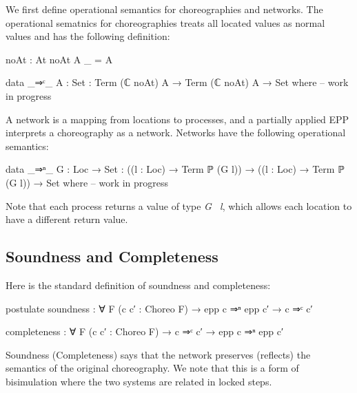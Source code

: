We first define operational semantics for choreographies and networks.
%
The operational sematnics for choreographies treats all located values as normal values and has the following definition:
%
\begin{center}\begin{code}
noAt : At
noAt A _ = A

data _⇒ᶜ_ {A : Set} : Term (ℂ noAt) A → Term (ℂ noAt) A → Set where
-- work in progress
\end{code}\end{center}
%
A network is a mapping from locations to processes, and a partially applied EPP interprets a choreography as a network.
%
Networks have the following operational semantics:
%
\begin{center}\begin{code}
data _⇒ⁿ_ {G : Loc → Set} :
  ((l : Loc) → Term ℙ (G l)) → ((l : Loc) → Term ℙ (G l)) → Set where
-- work in progress
\end{code}\end{center}
%
Note that each process returns a value of type \textit{G \ l}, which allows each location to have a different return value.

\subsection{Soundness and Completeness}

Here is the standard definition of soundness and completeness:
%
\begin{center}\begin{code}
postulate
  soundness : ∀ {F} (c c′ : Choreo F) →
    epp c ⇒ⁿ epp c′ → c ⇒ᶜ c′

  completeness : ∀ {F} (c c′ : Choreo F) →
    c ⇒ᶜ c′ → epp c ⇒ⁿ epp c′
\end{code}\end{center}
%
Soundness (Completeness) says that the network preserves (reflects) the semantics of the original choreography.
%
We note that this is a form of bisimulation where the two systems are related in locked steps.
